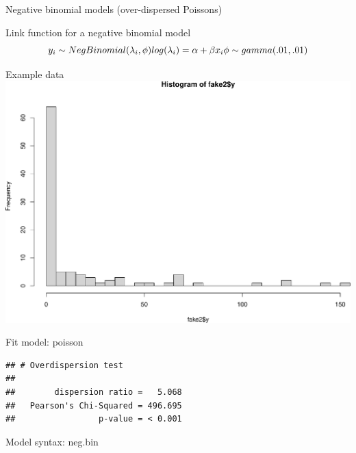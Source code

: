 \documentclass[
  ignorenonframetext,
]{beamer}
\begin{document}
\begin{frame}[fragile]{Negative binomial models (over-dispersed
Poissons)}
\protect\hypertarget{negative-binomial-models-over-dispersed-poissons}{}
\begin{block}{Link function for a negative binomial model}
\protect\hypertarget{link-function-for-a-negative-binomial-model}{}
\[
y_i \sim NegBinomial(\lambda_i,\phi)\\
log(\lambda_i) = \alpha +\beta x_i\\
\phi \sim gamma(.01,.01)
\]
\end{block}

\begin{block}{Example data}
\protect\hypertarget{example-data}{}
\includegraphics{slides_files/figure-beamer/unnamed-chunk-40-1.pdf}
\end{block}

\begin{block}{Fit model: poisson}
\protect\hypertarget{fit-model-poisson}{}
\begin{verbatim}
## # Overdispersion test
## 
##        dispersion ratio =   5.068
##   Pearson's Chi-Squared = 496.695
##                 p-value = < 0.001
\end{verbatim}
\end{block}

\begin{block}{Model syntax: neg.bin}
\protect\hypertarget{model-syntax-neg.bin}{}
\end{block}


\end{frame}
\end{document}
